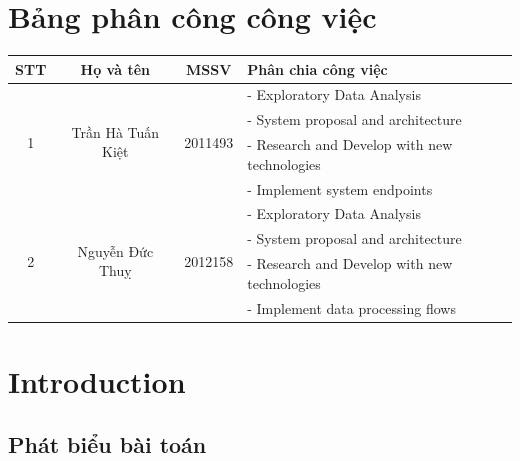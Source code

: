 \documentclass[12pt, a4paper]{report}
\theoremstyle{definition}
\begin{document}
\chapter*{Bảng phân công công việc}
\begin{table}[H]
    \centering
    \renewcommand{\arraystretch}{1.5}
    \begin{tabular}{|c|c|c|l|}
        \hline
        \textbf{STT}       & \textbf{Họ và tên}                 & \textbf{MSSV}            & \textbf{Phân chia công việc}                 \\
        \hline
        \multirow{4}{*}{1} & \multirow{4}{*}{Trần Hà Tuấn Kiệt} & \multirow{4}{*}{2011493} & - Exploratory Data Analysis                  \\
                           &                                    &                          & - System proposal and architecture           \\
                           &                                    &                          & - Research and Develop with new technologies \\
                           &                                    &                          & - Implement system endpoints                 \\
        \hline
        \multirow{4}{*}{2} & \multirow{4}{*}{Nguyễn Đức Thuỵ}   & \multirow{4}{*}{2012158} & - Exploratory Data Analysis                  \\
                           &                                    &                          & - System proposal and architecture           \\
                           &                                    &                          & - Research and Develop with new technologies \\
                           &                                    &                          & - Implement data processing flows            \\
        \hline
    \end{tabular}
\end{table}
\newpage
\tableofcontents
\newpage
\listoffigures
\listoftables
\chapter{Introduction}
\section{Phát biểu bài toán}

\end{document}
